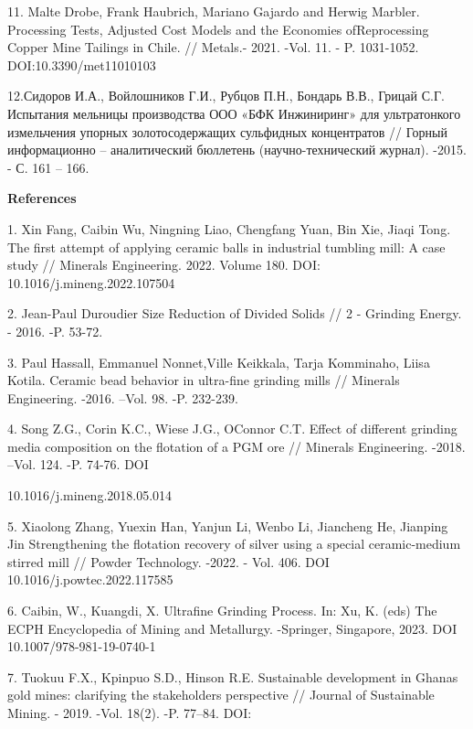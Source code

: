 \begin{noparindent}
11. Malte Drobe, Frank Haubrich, Mariano Gajardo and Herwig Marbler.
Processing Tests, Adjusted Cost Models and the Economies ofReprocessing
Copper Mine Tailings in Chile. // Metals.- 2021. -Vol. 11. - P.
1031-1052. DOI:10.3390/met11010103

12.Сидоров И.А., Войлошников Г.И., Рубцов П.Н., Бондарь В.В., Грицай
С.Г. Испытания мельницы производства ООО «БФК Инжиниринг» для
ультратонкого измельчения упорных золотосодержащих сульфидных
концентратов // Горный информационно -- аналитический бюллетень
(научно-технический журнал). -2015. - С. 161 -- 166.
\end{noparindent}

\begin{center}
{\bfseries References}
\end{center}

\begin{noparindent}
1. Xin Fang, Caibin Wu, Ningning Liao, Chengfang Yuan, Bin Xie, Jiaqi
Tong. The first attempt of applying ceramic balls in industrial tumbling
mill: A case study // Minerals Engineering. 2022. Volume 180. DOI:
10.1016/j.mineng.2022.107504

2. Jean-Paul Duroudier Size Reduction of Divided Solids // 2 - Grinding
Energy. - 2016. -P. 53-72.

3. Paul Hassall, Emmanuel Nonnet,Ville Keikkala, Tarja Komminaho, Liisa
Kotila. Ceramic bead behavior in ultra-fine grinding mills // Minerals
Engineering. -2016. --Vol. 98. -P. 232-239.

4. Song Z.G., Corin K.C., Wiese J.G., O\textquotesingle Connor C.T.
Effect of different grinding media composition on the flotation of a PGM
ore // Minerals Engineering. -2018. --Vol. 124. -P. 74-76. DOI

10.1016/j.mineng.2018.05.014

5. Xiaolong Zhang, Yuexin Han, Yanjun Li, Wenbo Li, Jiancheng He,
Jianping Jin Strengthening the flotation recovery of silver using a
special ceramic-medium stirred mill // Powder Technology. -2022. - Vol.
406. DOI 10.1016/j.powtec.2022.117585

6. Caibin, W., Kuangdi, X. Ultrafine Grinding Process. In: Xu, K. (eds)
The ECPH Encyclopedia of Mining and Metallurgy. -Springer, Singapore,
2023. DOI 10.1007/978-981-19-0740-1

7. Tuokuu F.X., Kpinpuo S.D., Hinson R.E. Sustainable development in
Ghana\textquotesingle s gold mines: clarifying the
stakeholder\textquotesingle s perspective // Journal of Sustainable
Mining. - 2019. -Vol. 18(2). -P. 77--84. DOI:


\end{noparindent}
